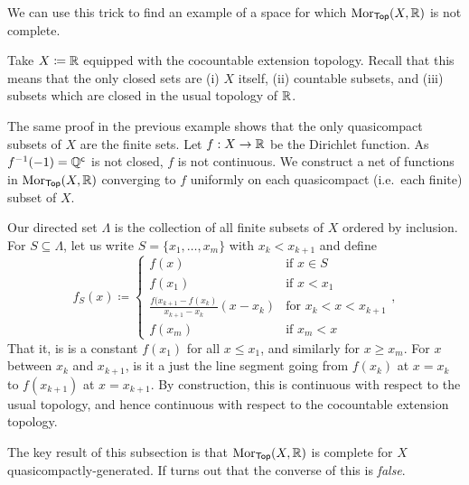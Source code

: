 We can use this trick to find an example of a space for which $\operatorname{Mor} _{\mathsf{Top}}(X,\mathbb{R} )$ is not complete.
\begin{exm}
Take $X\coloneqq \mathbb{R}$ equipped with the cocountable extension topology.  Recall that this means that the only closed sets are (i) $X$ itself, (ii) countable subsets, and (iii) subsets which are closed in the usual topology of $\mathbb{R}$.

The same proof in the previous example shows that the only quasicompact subsets of $X$ are the finite sets.  Let $f:X\rightarrow \mathbb{R}$ be the Dirichlet function.  As $f^{-1}(-1)=\mathbb{Q} ^{\mathsf{c}}$ is not closed, $f$ is not continuous.  We construct a net of functions in $\operatorname{Mor} _{\mathsf{Top}}(X,\mathbb{R} )$ converging to $f$ uniformly on each quasicompact (i.e.~each finite) subset of $X$.

Our directed set $\Lambda$ is the collection of all finite subsets of $X$ ordered by inclusion.  For $S\subseteq \Lambda$, let us write $S=\{ x_1,\ldots ,x_m\}$ with $x_k<x_{k+1}$ and define
\begin{equation}
f_S(x)\coloneqq \begin{cases}f(x) & \text{if }x\in S \\ f(x_1) & \text{if }x<x_1 \\ \frac{f(x_{k+1}-f(x_k)}{x_{k+1}-x_k}(x-x_k) & \text{for }x_k<x<x_{k+1} \\ f(x_m) & \text{if }x_m<x\end{cases},
\end{equation}
That it, is is a constant $f(x_1)$ for all $x\leq x_1$, and similarly for $x\geq x_m$.  For $x$ between $x_k$ and $x_{k+1}$, is it a just the line segment going from $f(x_k)$ at $x=x_k$ to $f(x_{k+1})$ at $x=x_{k+1}$.  By construction, this is continuous with respect to the usual topology, and hence continuous with respect to the cocountable extension topology.
\end{exm}
The key result of this subsection is that $\operatorname{Mor} _{\mathsf{Top}}(X,\mathbb{R} )$ is complete for $X$ quasicompactly-generated.  If turns out that the converse of this is \emph{false}.
